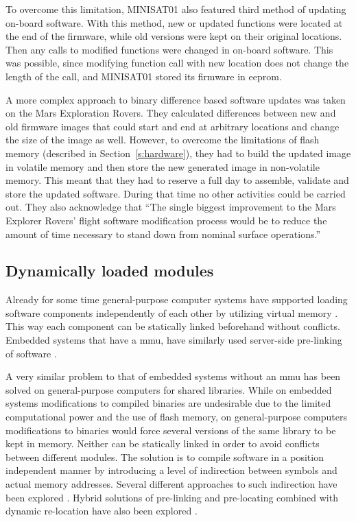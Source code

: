 To overcome this limitation, MINISAT01 also featured third method of updating on-board software. With this method, new or updated functions were located at the end of the firmware, while old versions were kept on their original locations. Then any calls to modified functions were changed in on-board software. This was possible, since modifying function call with new location does not change the length of the call, and MINISAT01 stored its firmware in \gls{eeprom}. \cite{Garrido1998}

A more complex approach to binary difference based software updates was taken on the Mars Exploration Rovers. They calculated differences between new and old firmware images that could start and end at arbitrary locations and change the size of the image as well. However, to overcome the limitations of flash memory (described in Section~\ref{s:hardware}), they had to build the updated image in volatile memory and then store the new generated image in non-volatile memory. This meant that they had to reserve a full day to assemble, validate and store the updated software. During that time no other activities could be carried out. They also acknowledge that ``The single biggest improvement to the Mars Explorer Rovers' flight software modification process would be to reduce the amount of time necessary to stand down from nominal surface operations.'' \cite{Greco2005}

\subsection{Dynamically loaded modules}

Already for some time general-purpose computer systems have supported loading software components independently of each other by utilizing virtual memory \cite{Kilburn1962}. This way each component can be statically linked beforehand without conflicts. Embedded systems that have a \gls{mmu}, have similarly used server-side pre-linking of software \cite{Shen2010}.

A very similar problem to that of embedded systems without an \gls{mmu} has been solved on general-purpose computers for shared libraries. While on embedded systems modifications to compiled binaries are undesirable due to the limited computational power and the use of flash memory, on general-purpose computers modifications to binaries would force several versions of the same library to be kept in memory. Neither can be statically linked in order to avoid conflicts between different modules. The solution is to compile software in a position independent manner by introducing a level of indirection between symbols and actual memory addresses. Several different approaches to such indirection have been explored \cite[Chapter~8]{Levine1999}. Hybrid solutions of pre-linking and pre-locating combined with dynamic re-location have also been explored \cite{Dong2009}.

